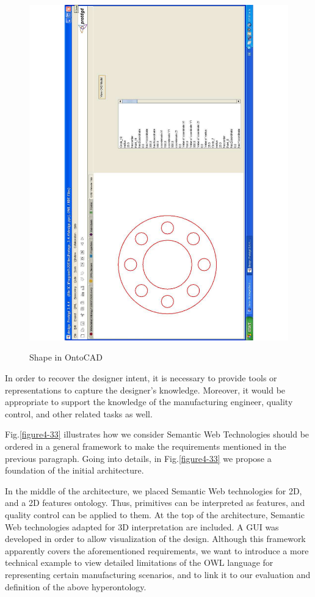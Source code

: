 \begin{figure}
\begin{center}
	\includegraphics[scale=0.5,angle=270]{figure-chapterIV/fig432}\\
	\caption{Shape in OntoCAD}
	\label{figure432}
\end{center}
\end{figure}


In order to recover the designer intent, it is necessary to provide tools or representations to capture the designer’s knowledge. Moreover, it would be appropriate to support the knowledge of the manufacturing engineer, quality control, and other related tasks as well. 

Fig.\ref{figure4-33} illustrates how we consider Semantic Web Technologies should be ordered in a general framework to make the requirements mentioned in the previous paragraph. Going into details, in Fig.\ref{figure4-33} we propose a foundation of the initial architecture.

In the middle of the architecture, we placed Semantic Web technologies for 2D, and a 2D features ontology. Thus, primitives can be interpreted as features, and quality control can be applied to them. At the top of the architecture, Semantic Web technologies adapted for 3D interpretation are included. A GUI was developed in order to allow visualization of the design. Although this framework apparently covers the aforementioned requirements, we want to introduce a more technical example to view detailed limitations of  the OWL  language for representing certain manufacturing scenarios, and to link it to our evaluation and definition of the above hyperontology.


